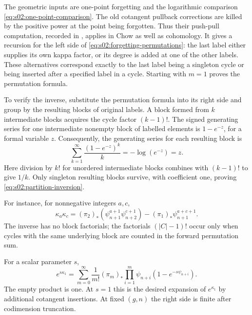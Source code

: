 \begin{prf}
The geometric inputs are one-point forgetting and the logarithmic
comparison \eqref{eq:s02:one-point-comparison}.  The old cotangent
pullback corrections are killed by the positive power at the point
being forgotten.  Thus their push-pull computation, recorded in
\cite[(2.9)--(2.11)]{KMZ96}, applies in Chow as well as cohomology.
It gives a recursion for the left side of
\eqref{eq:s02:forgetting-permutations}: the last label either supplies
its own kappa factor, or its degree is added at one of the other
labels.  These alternatives correspond exactly to the last label
being a singleton cycle or being inserted after a specified label in
a cycle.  Starting with $m=1$ proves the permutation formula.

To verify the inverse, substitute the permutation formula into its
right side and group by the resulting blocks of original labels.  A
block formed from $k$ intermediate blocks acquires the cycle factor
$(k-1)!$.  The signed generating series for one intermediate nonempty
block of labelled elements is $1-e^{-z}$, for a formal variable $z$.
Consequently, the generating series for each resulting block is
\[
\sum_{k=1}^{\infty}\frac{(1-e^{-z})^k}{k}
=-\log(e^{-z})=z.
\]
Here division by $k!$ for unordered intermediate blocks combines with
$(k-1)!$ to give $1/k$.  Only singleton resulting blocks survive,
with coefficient one, proving \eqref{eq:s02:partition-inversion}.
\end{prf}

For instance, for nonnegative integers $a,c$,
\begin{equation}
\label{eq:s02:two-kappas}
\kappa_a\kappa_c
=(\pi_2)_*(\psi_{n+1}^{a+1}\psi_{n+2}^{c+1})
-(\pi_1)_*\psi_{n+1}^{a+c+1}.
\end{equation}
The inverse has no block factorials; the factorials $(|C|-1)!$ occur
only when cycles with the same underlying block are counted in the
forward permutation sum.

\begin{crl}
\label{crl:s02:kappa-exponential}
For a scalar parameter $s$,
\begin{equation}
\label{eq:s02:kappa-exponential}
e^{s\kappa_1}
=\sum_{m=0}^{\infty}\frac{1}{m!}(\pi_m)_*
\prod_{i=1}^m\psi_{n+i}(1-e^{-s\psi_{n+i}}).
\end{equation}
The empty product is one.  At $s=1$ this is the desired expansion of
$e^{\kappa_1}$ by additional cotangent insertions.  At fixed $(g,n)$
the right side is finite after codimension truncation.
\end{crl}

